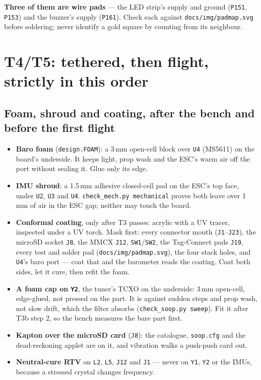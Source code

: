 \documentclass[11pt,a4paper]{article}
\newcommand{\file}[1]{\texttt{\small #1}}
\newcommand{\cmd}[1]{\texttt{\small #1}}
\newcommand{\flag}[1]{\textcolor{warnred}{\textbf{#1}}}
\begin{document}
\flag{Three of them are wire pads} --- the LED strip's supply and ground (\file{P151},
\file{P153}) and the buzzer's supply (\file{P161}). Check each against
\file{docs/img/padmap.svg} before soldering; never identify a gold square by counting from
its neighbour.

\section{T4/T5: tethered, then flight, strictly in this order}

\subsection{Foam, shroud and coating, after the bench and before the first flight}

\begin{itemize}
\item \textbf{Baro foam} (\file{design.FOAM}): a 3\,mm open-cell block over \file{U4}
(MS5611) on the board's underside. It keeps light, prop wash and the ESC's warm air off the
port without sealing it. Glue only its edge.
\item \textbf{IMU shroud}: a 1.5\,mm adhesive closed-cell pad on the ESC's top face, under
\file{U2}, \file{U3} and \file{U4}. \file{check\_mech.py mechanical} proves both leave over 1\,mm
of air in the ESC gap; neither may touch the board.
\item \textbf{Conformal coating}, only after T3 passes: acrylic with a UV tracer, inspected
under a UV torch. Mask first: every connector mouth (\file{J1}--\file{J23}), the microSD
socket \file{J8}, the MMCX \file{J12}, \file{SW1}/\file{SW2}, the Tag-Connect pads \file{J19},
every test and solder pad (\file{docs/img/padmap.svg}), the four stack holes, and \file{U4}'s
baro port --- coat that and the barometer reads the coating. Coat both sides, let it cure,
then refit the foam.
\item \textbf{A foam cap on \file{Y2}}, the tuner's TCXO on the underside: 3\,mm open-cell,
edge-glued, not pressed on the part. It is against sudden steps and prop wash, not slow drift,
which the filter absorbs (\cmd{check\_soop.py sweep}). Fit it after T3b step 2, so the bench
measures the bare part first.
\item \textbf{Kapton over the microSD card} (\file{J8}): the catalogue, \file{soop.cfg} and the
dead-reckoning applet are on it, and vibration walks a push-push card out.
\item \textbf{Neutral-cure RTV} on \file{L2}, \file{L5}, \file{J12} and \file{J1} --- never on
\file{Y1}, \file{Y2} or the IMUs, because a stressed crystal changes frequency.
\end{itemize}
\end{document}

